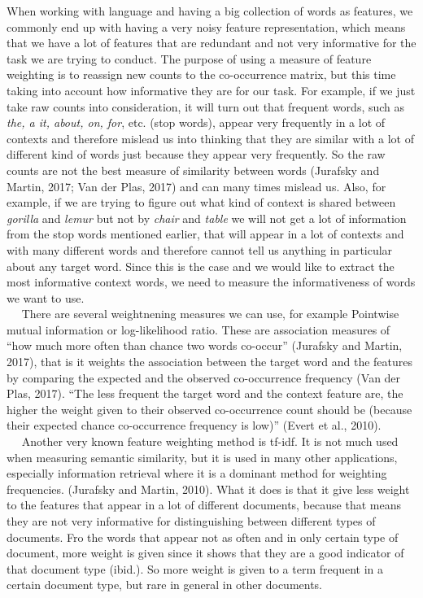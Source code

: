 \documentclass[11pt]{article}
\begin{document}
When working with language and having a big collection of words as
features, we commonly end up with having a very noisy feature
representation, which means that we have a lot of features that are
redundant and not very informative for the task we are trying to
conduct. The purpose of using a measure of feature weighting is to
reassign new counts to the co-occurrence matrix, but this time taking
into account how informative they are for our task. For example, if we
just take raw counts into consideration, it will turn out that frequent
words, such as \emph{the, a it, about, on, for}, etc. (stop words),
appear very frequently in a lot of contexts and therefore mislead us
into thinking that they are similar with a lot of different kind of
words just because they appear very frequently. So the raw counts are
not the best measure of similarity between words (Jurafsky and Martin,
2017; Van der Plas, 2017) and can many times mislead us. Also, for
example, if we are trying to figure out what kind of context is shared
between \emph{gorilla} and \emph{lemur} but not by \emph{chair} and
\emph{table} we will not get a lot of information from the stop words
mentioned earlier, that will appear in a lot of contexts and with many
different words and therefore cannot tell us anything in particular
about any target word. Since this is the case and we would like to
extract the most informative context words, we need to measure the
informativeness of words we want to use.\\
   There are several weightnening measures we can use, for example
Pointwise mutual information or log-likelihood ratio. These are
association measures of ``how much more often than chance two words
co-occur'' (Jurafsky and Martin, 2017), that is it weights the
association between the target word and the features by comparing the
expected and the observed co-occurrence frequency (Van der Plas, 2017).
``The less frequent the target word and the context feature are, the
higher the weight given to their observed co-occurrence count should be
(because their expected chance co-occurrence frequency is low)'' (Evert
et al., 2010).\\
   Another very known feature weighting method is tf-idf. It is not much
used when measuring semantic similarity, but it is used in many other
applications, especially information retrieval where it is a dominant
method for weighting frequencies. (Jurafsky and Martin, 2010). What it
does is that it give less weight to the features that appear in a lot of
different documents, because that means they are not very informative
for distinguishing between different types of documents. Fro the words
that appear not as often and in only certain type of document, more
weight is given since it shows that they are a good indicator of that
document type (ibid.). So more weight is given to a term frequent in a
certain document type, but rare in general in other documents.
\end{document}
